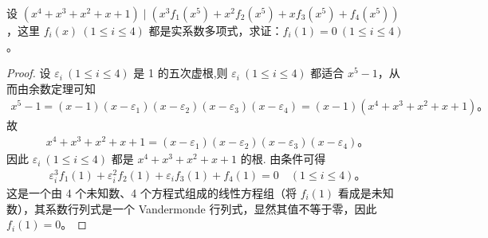 \documentclass[../../main.tex]{subfiles}
\begin{document}
\begin{example}
设 $(x^4 + x^3 + x^2 + x + 1) \mid (x^3 f_1(x^5) + x^2 f_2(x^5) + x f_3(x^5) + f_4(x^5))$，这里 $f_i(x) \ (1 \leq i \leq 4)$ 都是实系数多项式，求证：$f_i(1) = 0 \ (1 \leq i \leq 4)$。
\end{example}
\begin{proof}
设 $\varepsilon_i \ (1 \leq i \leq 4)$ 是 1 的五次虚根,则 $\varepsilon_i \ (1 \leq i \leq 4)$ 都适合 $x^5 - 1$，从而由余数定理可知
\begin{align*}
x^5 - 1 = (x - 1)(x - \varepsilon_1)(x - \varepsilon_2)(x - \varepsilon_3)(x - \varepsilon_4) = (x - 1)(x^4 + x^3 + x^2 + x + 1)。
\end{align*}
故
\begin{align*}
x^4 + x^3 + x^2 + x + 1 = (x - \varepsilon_1)(x - \varepsilon_2)(x - \varepsilon_3)(x - \varepsilon_4)。
\end{align*}
因此 $\varepsilon_i \ (1 \leq i \leq 4)$ 都是 $x^4 + x^3 + x^2 + x + 1$ 的根.
由条件可得
\begin{align*}
\varepsilon_i^3 f_1(1) + \varepsilon_i^2 f_2(1) + \varepsilon_i f_3(1) + f_4(1) = 0 \quad (1 \leq i \leq 4)。
\end{align*}
这是一个由 4 个未知数、4 个方程式组成的线性方程组（将 $f_i(1)$ 看成是未知数），其系数行列式是一个 Vandermonde 行列式，显然其值不等于零，因此 $f_i(1) = 0$。
\end{proof}
\end{document}
